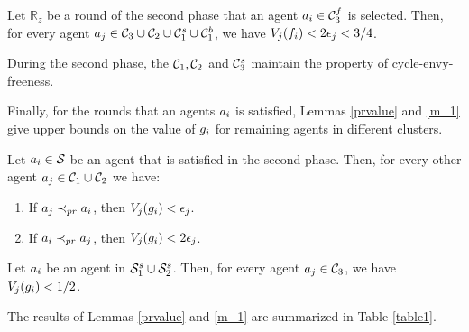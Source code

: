 \begin{lemma}
\label{c3fsmall}
Let $\mathbb{R}_z$ be a round of the second phase that an agent $a_i \in \mathcal{C}_3^f$ is selected. Then, for every agent $a_j \in \mathcal{C}_3 \cup \mathcal{C}_2 \cup \mathcal{C}_1^s \cup \mathcal{C}_1^b$, we have $V_j(f_i)<2\epsilon_j<3/4$.
\end{lemma}



\begin{lemma}
\label{cef}
During the second phase, the $\mathcal{C}_1,\mathcal{C}_2$ and $\mathcal{C}_3^s$ maintain the property of cycle-envy-freeness. 
\end{lemma}

Finally, for the rounds that an agents $a_i$ is satisfied, Lemmas \ref{prvalue} and \ref{m_1} give upper bounds on the value of $g_i$ for remaining agents in different clusters. 

\begin{lemma}
\label{prvalue}
Let $a_i \in \mathcal{S}$ be an agent that is satisfied in the second phase. Then, for every other agent $a_j \in \mathcal{C}_1 \cup \mathcal{C}_2$ we have:

\begin{minipage}[t]{\linegoal}
\begin{enumerate}[leftmargin=30pt]
\item If $a_j \prec_{pr} a_i$, then $V_j(g_i) < \epsilon_j$.
\item If $a_i \prec_{pr} a_j$, then $V_j(g_i) < 2\epsilon_j$.
\end{enumerate}
\end{minipage}
\end{lemma}

\begin{lemma}
\label{m_1}
Let $a_i$ be an agent in $\mathcal{S}_1^s \cup \mathcal{S}_2^s$. Then, for every agent $a_j \in \mathcal{C}_3$, we have $V_j(g_i) < {1/2}$.
\end{lemma}

The results of Lemmas \ref{prvalue} and \ref{m_1} are summarized in Table \ref{table1}.







